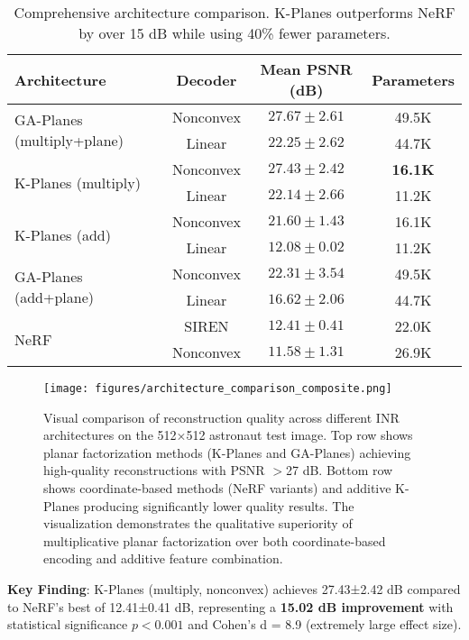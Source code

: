 \documentclass{article}
\begin{document}
\begin{table}[t]
\centering
\small
\begin{tabular}{@{}lccc@{}}
\toprule
\textbf{Architecture} & \textbf{Decoder} & \textbf{Mean PSNR (dB)} & \textbf{Parameters} \\
\midrule
\multirow{2}{*}{GA-Planes (multiply+plane)} & Nonconvex & $\mathbf{27.67 \pm 2.61}$ & 49.5K \\
 & Linear & $22.25 \pm 2.62$ & 44.7K \\
\midrule
\multirow{2}{*}{K-Planes (multiply)} & Nonconvex & $27.43 \pm 2.42$ & \textbf{16.1K} \\
 & Linear & $22.14 \pm 2.66$ & 11.2K \\
\midrule
\multirow{2}{*}{K-Planes (add)} & Nonconvex & $21.60 \pm 1.43$ & 16.1K \\
 & Linear & $12.08 \pm 0.02$ & 11.2K \\
\midrule
\multirow{2}{*}{GA-Planes (add+plane)} & Nonconvex & $22.31 \pm 3.54$ & 49.5K \\
 & Linear & $16.62 \pm 2.06$ & 44.7K \\
\midrule
\multirow{2}{*}{NeRF} & SIREN & $12.41 \pm 0.41$ & 22.0K \\
 & Nonconvex & $11.58 \pm 1.31$ & 26.9K \\
\bottomrule
\end{tabular}
\caption{Comprehensive architecture comparison. K-Planes outperforms NeRF by over 15 dB while using 40\% fewer parameters.}
\label{tab:primary_results}
\end{table}

\begin{figure}[ht]
\centering
\texttt{[image: figures/architecture\_comparison\_composite.png]}
\caption{Visual comparison of reconstruction quality across different INR architectures on the 512×512 astronaut test image. Top row shows planar factorization methods (K-Planes and GA-Planes) achieving high-quality reconstructions with PSNR $>$27 dB. Bottom row shows coordinate-based methods (NeRF variants) and additive K-Planes producing significantly lower quality results. The visualization demonstrates the qualitative superiority of multiplicative planar factorization over both coordinate-based encoding and additive feature combination.}
\label{fig:architecture_comparison}
\end{figure}

\textbf{Key Finding}: K-Planes (multiply, nonconvex) achieves 27.43±2.42 dB compared to NeRF's best of 12.41±0.41 dB, representing a \textbf{15.02 dB improvement} with statistical significance $p < 0.001$ and Cohen's d = 8.9 (extremely large effect size).
\end{document}

